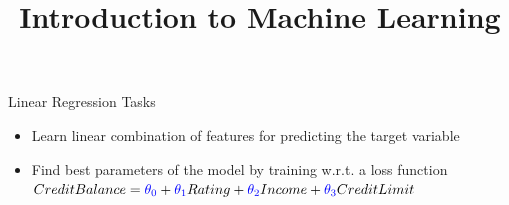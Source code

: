 \documentclass[11pt,compress,t,notes=noshow, xcolor=table]{beamer}
\title{Introduction to Machine Learning}
\date{}
\begin{document}
\sloppy

\begin{vbframe}{Linear Regression Tasks}
\begin{itemize}
\item \small Learn linear combination of features for predicting the target variable
\item \small Find best parameters of the model by training w.r.t. a loss function $Credit Balance = \textcolor{blue}{\theta_0} + \textcolor{blue}{\theta_1}Rating + \textcolor{blue}{\theta_2}Income + \textcolor{blue}{\theta_3}Credit Limit$

\end{itemize}


\end{vbframe}
\end{document}
